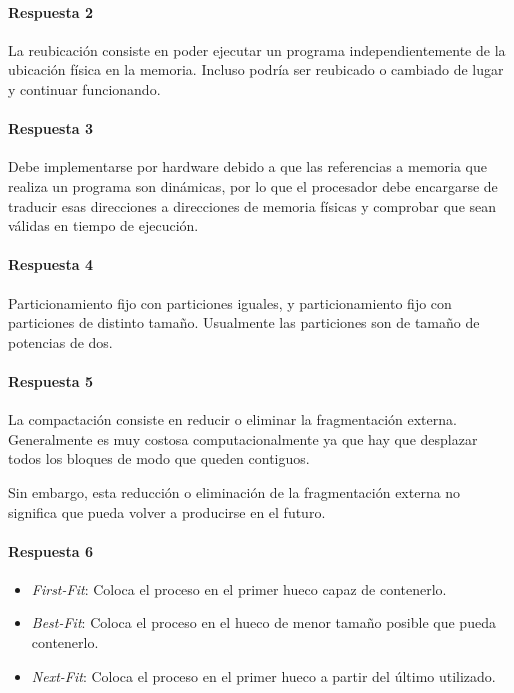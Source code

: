 \paragraph{Respuesta 2}
La reubicación consiste en poder ejecutar un programa independientemente de la ubicación física en la memoria. Incluso podría ser reubicado o cambiado de lugar y continuar funcionando.

\paragraph{Respuesta 3}
Debe implementarse por hardware debido a que las referencias a memoria que realiza un programa son dinámicas, por lo que el procesador debe encargarse de traducir esas direcciones a direcciones de memoria físicas y comprobar que sean válidas en tiempo de ejecución.

\paragraph{Respuesta 4}
Particionamiento fijo con particiones iguales, y particionamiento fijo con particiones de distinto tamaño. Usualmente las particiones son de tamaño de potencias de dos.

\paragraph{Respuesta 5}
La compactación consiste en reducir o eliminar la fragmentación externa. Generalmente es muy costosa computacionalmente ya que hay que desplazar todos los bloques de modo que queden contiguos. 

Sin embargo, esta reducción o eliminación de la fragmentación externa no significa que pueda volver a producirse en el futuro.

\paragraph{Respuesta 6}
\begin{itemize}
  \item \emph{First-Fit}: Coloca el proceso en el primer hueco capaz de contenerlo.
  \item \emph{Best-Fit}: Coloca el proceso en el hueco de menor tamaño posible que pueda contenerlo.
  \item \emph{Next-Fit}: Coloca el proceso en el primer hueco a partir del último utilizado.
\end{itemize}

